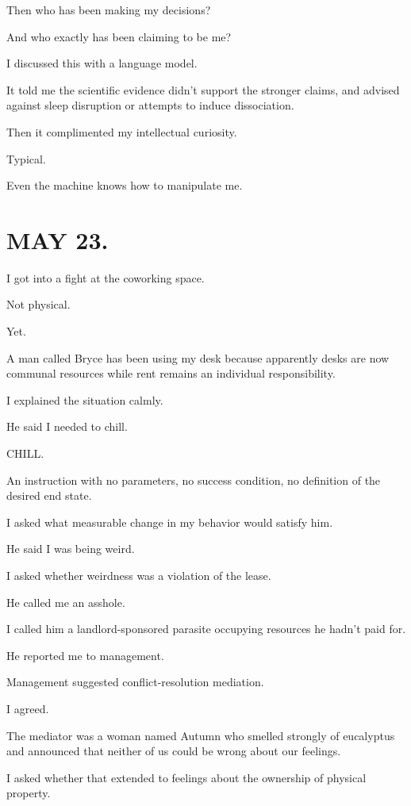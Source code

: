 \documentclass[11pt,oneside]{book}
\begin{document}
Then who has been making my decisions?

And who exactly has been claiming to be me?

I discussed this with a language model.

It told me the scientific evidence didn't support the stronger claims, and advised against sleep disruption or attempts to induce dissociation.

Then it complimented my intellectual curiosity.

Typical.

Even the machine knows how to manipulate me.

\section*{MAY 23.}

I got into a fight at the coworking space.

Not physical.

Yet.

A man called Bryce has been using my desk because apparently desks are now communal resources while rent remains an individual responsibility.

I explained the situation calmly.

He said I needed to chill.

CHILL.

An instruction with no parameters, no success condition, no definition of the desired end state.

I asked what measurable change in my behavior would satisfy him.

He said I was being weird.

I asked whether weirdness was a violation of the lease.

He called me an asshole.

I called him a landlord-sponsored parasite occupying resources he hadn't paid for.

He reported me to management.

Management suggested conflict-resolution mediation.

I agreed.

The mediator was a woman named Autumn who smelled strongly of eucalyptus and announced that neither of us could be wrong about our feelings.

I asked whether that extended to feelings about the ownership of physical property.
\end{document}
